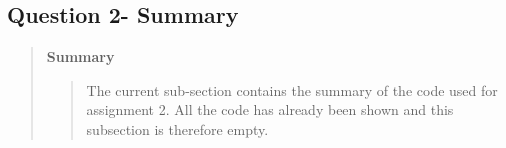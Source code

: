 
\subsection*{\textbf{Question 2- Summary}}
\begin{quote}

\textbf{Summary}
\begin{quote}
The current sub-section contains the summary of the code used for assignment 2. All the code has already been shown and this subsection is therefore empty. 
\end{quote}


\end{quote}









